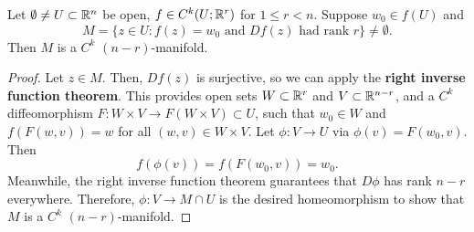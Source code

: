 \documentclass[a4paper]{article}
\begin{document}
\begin{thm}
  Let $\emptyset \neq U \subset \mathbb{R}^n$ be open, $f \in C^k(U;
    \mathbb{R}^r)$ for $1 \leq r < n$. Suppose $w_0 \in f(U)$ and
  \[
    M = \{z \in U : f(z) = w_0 \text{ and } Df(z) \text{ had rank
  $r$}\} \neq \emptyset.
  \]
  Then $M$ is a $C^k$ $(n-r)$-manifold.
\end{thm}

\begin{proof}
  Let $z \in M$. Then, $Df(z)$ is surjective, so we can apply the
  \textbf{right inverse function theorem}. This provides open sets $W
    \subset \mathbb{R}^r$ and $V \subset \mathbb{R}^{n-r}$, and a $C^k$ diffeomorphism $F :
    W \times V \to F(W \times V) \subset U$, such that $w_0 \in W$ and
  $f(F(w, v)) = w$ for all $(w, v) \in W \times V$. Let $\phi: V \to U$
  via $\phi(v) = F(w_0, v)$. Then
  \[
    f(\phi(v)) = f(F(w_0, v)) = w_0.
  \]
  Meanwhile, the right inverse function theorem guarantees that $D \phi$
  has rank $n - r$ everywhere. Therefore, $\phi: V \to M \cap U$ is the
  desired homeomorphism to show that $M$ is a $C^k$ $(n-r)$-manifold.
\end{proof}
\end{document}
